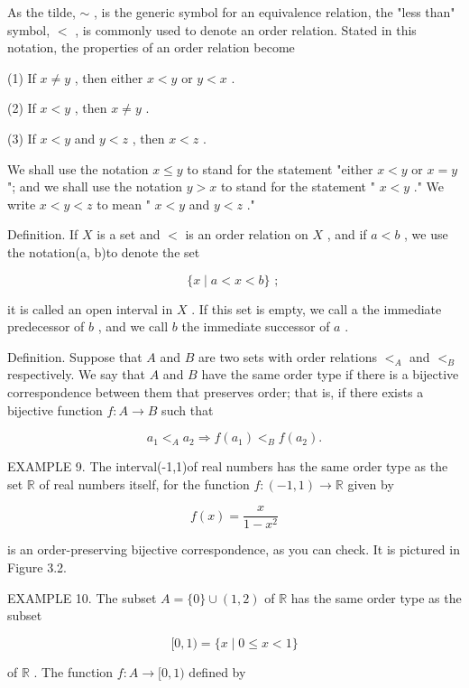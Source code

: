 As the tilde, \(\sim\) , is the generic symbol for an equivalence relation, the "less than" symbol, \(<\) , is commonly used to denote an order relation. Stated in this notation, the properties of an order relation become

(1) If \(x \neq  y\) , then either \(x < y\) or \(y < x\) .

(2) If \(x < y\) , then \(x \neq  y\) .

(3) If \(x < y\) and \(y < z\) , then \(x < z\) .

We shall use the notation \(x \leq  y\) to stand for the statement "either \(x < y\) or \(x = y\) "; and we shall use the notation \(y > x\) to stand for the statement " \(x < y\) ." We write \(x < y < z\) to mean " \(x < y\) and \(y < z\) ."

Definition. If \(X\) is a set and \(<\) is an order relation on \(X\) , and if \(a < b\) , we use the notation(a, b)to denote the set

\[
\{ x \mid  a < x < b\} \text{ ; }
\]

it is called an open interval in \(X\) . If this set is empty, we call a the immediate predecessor of \(b\) , and we call \(b\) the immediate successor of \(a\) .

Definition. Suppose that \(A\) and \(B\) are two sets with order relations \({ < }_{A}\) and \({ < }_{B}\) respectively. We say that \(A\) and \(B\) have the same order type if there is a bijective correspondence between them that preserves order; that is, if there exists a bijective function \(f : A \rightarrow  B\) such that

\[
{a}_{1}{ < }_{A}{a}_{2} \Rightarrow  f\left( {a}_{1}\right) { < }_{B}f\left( {a}_{2}\right) .
\]

EXAMPLE 9. The interval(-1,1)of real numbers has the same order type as the set \(\mathbb{R}\) of real numbers itself, for the function \(f : \left( {-1,1}\right)  \rightarrow  \mathbb{R}\) given by

\[
f\left( x\right)  = \frac{x}{1 - {x}^{2}}
\]

is an order-preserving bijective correspondence, as you can check. It is pictured in Figure 3.2.

EXAMPLE 10. The subset \(A = \{ 0\}  \cup  \left( {1,2}\right)\) of \(\mathbb{R}\) has the same order type as the subset

\[
\lbrack 0,1) = \{ x \mid  0 \leq  x < 1\}
\]

of \(\mathbb{R}\) . The function \(f : A \rightarrow  \lbrack 0,1)\) defined by

